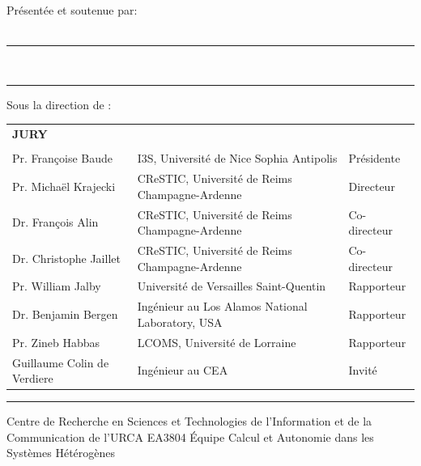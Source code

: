 \documentclass[11pt,a4paper]{book}
\begin{document}
{%
{
	\vspace{1cm}
	Pr\'esent\'ee et soutenue par:\\
	\vspace{.4cm}
	\Large
	\textbf{\phdAuthor}\\
	\vspace{.4cm}
	\large
	\vspace{.5cm}	
}

{
	\hrule height 2pt
	\vspace{2pt}
	\huge 
	\vspace{1cm}
	\phdTitleEN\\
	\large
	\vspace{0.5cm}
	\phdTitleFR
	\vspace{1.0cm}
	\hrule
	\vspace{1cm}
}

{
	Sous la direction de :\\ 
	\textbf{\phdDirector}
	\vspace{0.5cm}
	\vspace{\fill}
}

{
\normalsize
\begin{tabular}{l l l}
		\textbf{JURY} &  & \\
		&&\\
		Pr. Françoise Baude & I3S, Université de Nice Sophia Antipolis& Pr\'esidente\\
		Pr. Michaël Krajecki & CReSTIC, Université de Reims Champagne-Ardenne & Directeur \\
		Dr. François Alin & CReSTIC, Université de Reims Champagne-Ardenne & Co-directeur  \\
		Dr. Christophe Jaillet & CReSTIC, Université de Reims Champagne-Ardenne & Co-directeur \\
		Pr. William Jalby & Université de Versailles Saint-Quentin & Rapporteur\\
		Dr. Benjamin Bergen & Ingénieur au Los Alamos National Laboratory, USA & Rapporteur \\
		Pr. Zineb Habbas & LCOMS, Université de Lorraine & Rapporteur \\ 
		Guillaume Colin de Verdiere & Ingénieur au CEA & Invit\'e
\end{tabular}
\vspace{0.5cm}
\hrule
\vspace{0.3cm}
}

{
	Centre de Recherche en Sciences et Technologies de l'Information et de la Communication de l'URCA EA3804
}
{
	\'Equipe Calcul et Autonomie dans les Systèmes Hétérogènes
}

}
\end{document}
